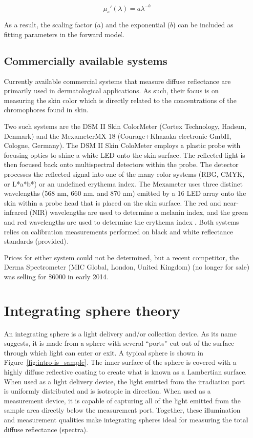 \begin{equation}
\mu_s'(\lambda) = a\lambda^{-b}
\end{equation}

As a result, the scaling factor ($a$) and the exponential ($b$) can be included as fitting parameters in the forward model.

\subsection{Commercially available systems}
Currently available commercial systems that measure diffuse reflectance are primarily used in dermatological applications. As such, their focus is on measuring the skin color which is directly related to the concentrations of the chromophores found in skin.

Two such systems are the DSM II Skin ColorMeter (Cortex Technology, Hadsun, Denmark) and the Mexameter\textregistered MX 18 (Courage+Khazaka electronic GmbH, Cologne, Germany). The DSM II Skin ColoMeter employs a plastic probe with focusing optics to shine a white LED onto the skin surface. The reflected light is then focused back onto multispectral detectors within the probe. The detector processes the reflected signal into one of the many color systems (RBG, CMYK, or L*a*b*) or an undefined erythema index. The Mexameter uses three distinct wavelengths (568 nm, 660 nm, and 870 nm) emitted by a 16 LED array onto the skin within a probe head that is placed on the skin surface. The red and near-infrared (NIR) wavelengths are used to determine a melanin index, and the green and red wavelengths are used to determine the erythema index .\cite{Wagner2002} Both systems relies on calibration measurements performed on black and white reflectance standards (provided).

Prices for either system could not be determined, but a recent competitor, the Derma Spectrometer (MIC Global, London, United Kingdom) (no longer for sale) was selling for \$6000 in early 2014.

\section{Integrating sphere theory}
\label{sec:is_theory}
An integrating sphere is a light delivery and/or collection device. As its name suggests, it is made from a sphere with several ``ports'' cut out of the surface through which light can enter or exit. A typical sphere is shown in Figure~\ref{fig:intro-is_sample}. The inner surface of the sphere is covered with a highly diffuse reflective coating to create what is known as a Lambertian surface. When used as a light delivery device, the light emitted from the irradiation port is uniformly distributed and is isotropic in direction. When used as a measurement device, it is capable of capturing all of the light emitted from the sample area directly below the measurement port. Together, these illumination and measurement qualities make integrating spheres ideal for measuring the total diffuse reflectance (spectra).

